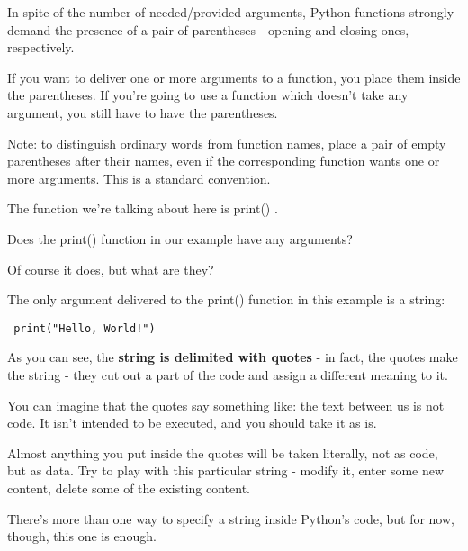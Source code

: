 \documentclass[a4paper,10pt]{article}
\begin{document}
In spite of the number of needed/provided arguments, Python functions strongly demand the presence of a pair of parentheses - opening and closing ones, respectively.
\newline

If you want to deliver one or more arguments to a function, you place them inside the parentheses. If you're going to use a function which doesn't take any argument, you still have to have the parentheses.
\newline

Note: to distinguish ordinary words from function names, place a pair of empty parentheses after their names, even if the corresponding function wants one or more arguments. This is a standard convention.
\newline

The function we're talking about here is {\selectfont print() }.
\newline

Does the {\selectfont print() }function in our example have any arguments?
\newline

Of course it does, but what are they?
\newline

The only argument delivered to the {\selectfont print()} function in this example is a string:
\begin{verbatim}
 print("Hello, World!")
\end{verbatim}

As you can see, the \textbf{string is delimited with quotes} - in fact, the quotes make the string - they cut out a part of the code and assign a different meaning to it.
\newline

You can imagine that the quotes say something like: the text between us is not code. It isn't intended to be executed, and you should take it as is.
\newline

Almost anything you put inside the quotes will be taken literally, not as code, but as data. Try to play with this particular string - modify it, enter some new content, delete some of the existing content.
\newline

There's more than one way to specify a string inside Python's code, but for now, though, this one is enough.
\newline
\end{document}
